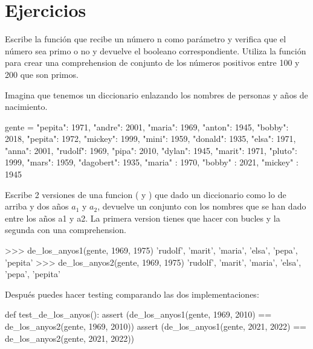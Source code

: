 \section{Ejercicios}

\begin{exercise}
Escribe la función  que recibe un número n como parámetro 
y verifica que el número sea primo o no y devuelve el booleano correspondiente. Utiliza la función para crear una comprehension de conjunto de los números positivos entre 100 y 200 que son primos.
\end{exercise}


\begin{exercise}
Imagina que tenemos un diccionario  enlazando los nombres de personas y años de nacimiento. 

\begin{python}
gente = {"pepita": 1971,
         "andre": 2001,
         "maria": 1969,
         "anton": 1945,
         "bobby": 2018,
         "pepita": 1972,
         "mickey": 1999,
         "mini": 1959,
         "donald": 1935,
         "elsa": 1971,
         "anna": 2001,
         "rudolf": 1969,
         "pipa": 2010,
         "dylan": 1945,
         "marit": 1971,
         "pluto": 1999,
         "mars": 1959,
         "dagobert": 1935,
         "maria" : 1970,
         "bobby" : 2021,
         "mickey" : 1945
         }
\end{python}

Escribe 2 versiones de una funcion ( y ) que dado un diccionario como lo de arriba y dos años $a_1$ y $a_2$, devuelve un conjunto con los nombres que se han dado entre los años a1 y a2. La primera version tienes que hacer con bucles y la segunda con una comprehension.

\begin{python}
>>> de_los_anyos1(gente, 1969, 1975)
{'rudolf', 'marit', 'maria', 'elsa', 'pepa', 'pepita'}
>>> de_los_anyos2(gente, 1969, 1975)
{'rudolf', 'marit', 'maria', 'elsa', 'pepa', 'pepita'}
\end{python}

Después puedes hacer testing comparando las dos implementaciones:

\begin{python}
def test_de_los_anyos():
    assert (de_los_anyos1(gente, 1969, 2010) == de_los_anyos2(gente, 1969, 2010))
    assert (de_los_anyos1(gente, 2021, 2022) == de_los_anyos2(gente, 2021, 2022))
\end{python}

\end{exercise}


